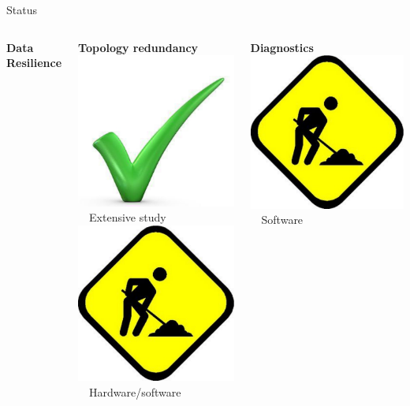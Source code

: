 \documentclass[compress,red]{beamer}
\begin{document}
\begin{frame}{Status}
\begin{columns}[c]
\begin{block}{{\bf Data Resilience}}
    \end{block}

    \begin{block}{ {\bf Topology redundancy}}
      \includegraphics[width=.5cm]{misc/big-tick.pdf}~~Extensive study \\
      \includegraphics[width=.5cm]{misc/underconstruction.pdf}~~Hardware/software
    \end{block}

    \begin{block}{  {\bf Diagnostics}}
      \includegraphics[width=.5cm]{misc/underconstruction.pdf}~~Software
    \end{block}

  \end{columns}


% 
% 
% 
% 
% 
% 
% 
% 
\end{frame}
\end{document}

